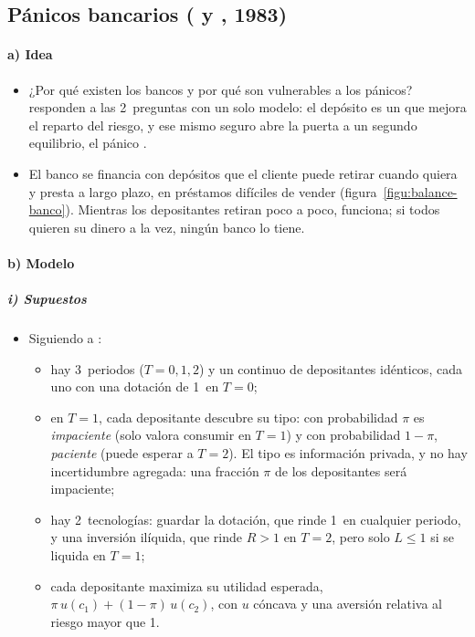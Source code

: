 \documentclass[11pt]{article}
\begin{document}
\subsection{Pánicos bancarios ( y , 1983)}\label{sec:diamond-dybvig}

\paragraph{a) Idea}

\begin{itemize}
\item ¿Por qué existen los bancos y por qué son vulnerables a los pánicos? \textcite{DiamondDybvig1983Bank} responden a las 2~preguntas con un solo modelo: el depósito es un  que mejora el reparto del riesgo, y ese mismo seguro abre la puerta a un segundo equilibrio, el pánico .
\item El banco se financia con depósitos que el cliente puede retirar cuando quiera y presta a largo plazo, en préstamos difíciles de vender (figura~\ref{figu:balance-banco}). Mientras los depositantes retiran poco a poco, funciona; si todos quieren su dinero a la vez, ningún banco lo tiene.
\end{itemize}

\begin{infografia}[H]
\centering
\caption{El balance estilizado de un banco y sus riesgos}\label{figu:balance-banco}
\end{infografia}

\paragraph{b) Modelo}

\subparagraph{i) Supuestos}

\begin{itemize}
\item Siguiendo a \textcite[cap.~7]{FreixasRochet2008Microeconomics}:
  \begin{itemize}
  \item hay 3~periodos ($T=0,1,2$) y un continuo de depositantes idénticos, cada uno con una dotación de 1~en $T=0$;
  \item en $T=1$, cada depositante descubre su tipo: con probabilidad $\pi$ es \emph{impaciente} (solo valora consumir en $T=1$) y con probabilidad $1-\pi$, \emph{paciente} (puede esperar a $T=2$). El tipo es información privada, y no hay incertidumbre agregada: una fracción $\pi$ de los depositantes será impaciente;
  \item hay 2~tecnologías: guardar la dotación, que rinde 1~en cualquier periodo, y una inversión ilíquida, que rinde $R>1$ en $T=2$, pero solo $L\leq1$ si se liquida en $T=1$;
  \item cada depositante maximiza su utilidad esperada, $\pi\,u(c_1)+(1-\pi)\,u(c_2)$, con $u$ cóncava y una aversión relativa al riesgo mayor que 1.
  \end{itemize}
\end{itemize}
\end{document}
